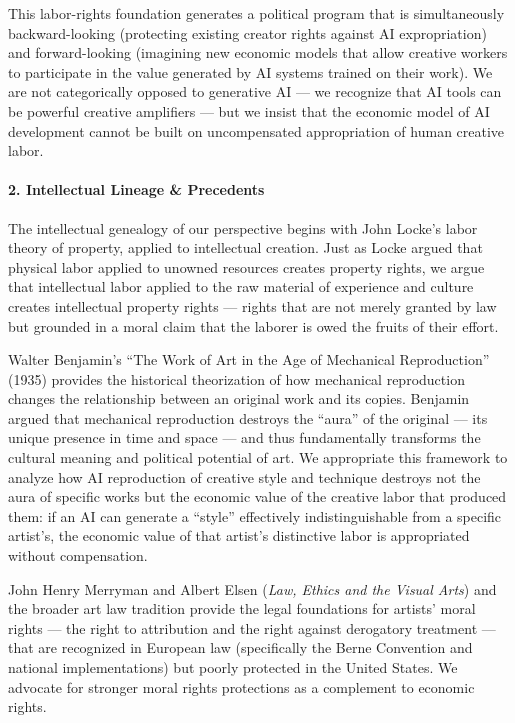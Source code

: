 This labor-rights foundation generates a political program that is
simultaneously backward-looking (protecting existing creator rights
against AI expropriation) and forward-looking (imagining new economic
models that allow creative workers to participate in the value generated
by AI systems trained on their work). We are not categorically opposed
to generative AI --- we recognize that AI tools can be powerful creative
amplifiers --- but we insist that the economic model of AI development
cannot be built on uncompensated appropriation of human creative labor.

\paragraph{2. Intellectual Lineage \&
Precedents}\label{intellectual-lineage-precedents-38}

The intellectual genealogy of our perspective begins with John Locke's
labor theory of property, applied to intellectual creation. Just as
Locke argued that physical labor applied to unowned resources creates
property rights, we argue that intellectual labor applied to the raw
material of experience and culture creates intellectual property rights
--- rights that are not merely granted by law but grounded in a moral
claim that the laborer is owed the fruits of their effort.

Walter Benjamin's ``The Work of Art in the Age of Mechanical
Reproduction'' (1935) provides the historical theorization of how
mechanical reproduction changes the relationship between an original
work and its copies. Benjamin argued that mechanical reproduction
destroys the ``aura'' of the original --- its unique presence in time
and space --- and thus fundamentally transforms the cultural meaning and
political potential of art. We appropriate this framework to analyze how
AI reproduction of creative style and technique destroys not the aura of
specific works but the economic value of the creative labor that
produced them: if an AI can generate a ``style'' effectively
indistinguishable from a specific artist's, the economic value of that
artist's distinctive labor is appropriated without compensation.

John Henry Merryman and Albert Elsen (\emph{Law, Ethics and the Visual
Arts}) and the broader art law tradition provide the legal foundations
for artists' moral rights --- the right to attribution and the right
against derogatory treatment --- that are recognized in European law
(specifically the Berne Convention and national implementations) but
poorly protected in the United States. We advocate for stronger moral
rights protections as a complement to economic rights.

